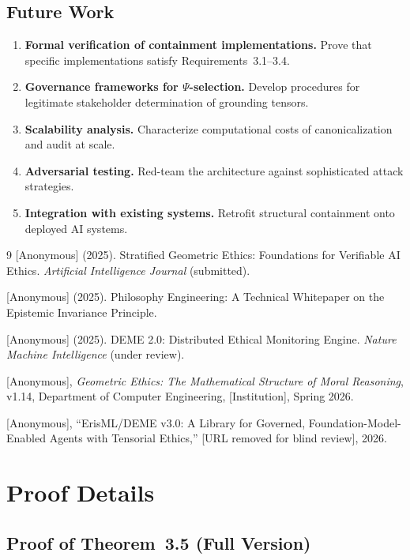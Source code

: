 \documentclass[12pt]{article}
\theoremstyle{definition}
\begin{document}
\subsection{Future Work}

\begin{enumerate}
    \item \textbf{Formal verification of containment implementations.} Prove that specific implementations satisfy Requirements~3.1--3.4.
    \item \textbf{Governance frameworks for $\Psi$-selection.} Develop procedures for legitimate stakeholder determination of grounding tensors.
    \item \textbf{Scalability analysis.} Characterize computational costs of canonicalization and audit at scale.
    \item \textbf{Adversarial testing.} Red-team the architecture against sophisticated attack strategies.
    \item \textbf{Integration with existing systems.} Retrofit structural containment onto deployed AI systems.
\end{enumerate}

\begin{thebibliography}{9}
[Anonymous] (2025). Stratified Geometric Ethics: Foundations for Verifiable AI Ethics. \textit{Artificial Intelligence Journal} (submitted).

[Anonymous] (2025). Philosophy Engineering: A Technical Whitepaper on the Epistemic Invariance Principle.

[Anonymous] (2025). DEME 2.0: Distributed Ethical Monitoring Engine. \textit{Nature Machine Intelligence} (under review).

[Anonymous], \emph{Geometric Ethics: The Mathematical Structure of Moral Reasoning}, v1.14, Department of Computer Engineering, [Institution], Spring 2026.

[Anonymous], ``ErisML/DEME v3.0: A Library for Governed, Foundation-Model-Enabled Agents with Tensorial Ethics,'' [URL removed for blind review], 2026.
\end{thebibliography}

\appendix

\section{Proof Details}

\subsection{Proof of Theorem~3.5 (Full Version)}
\end{document}

